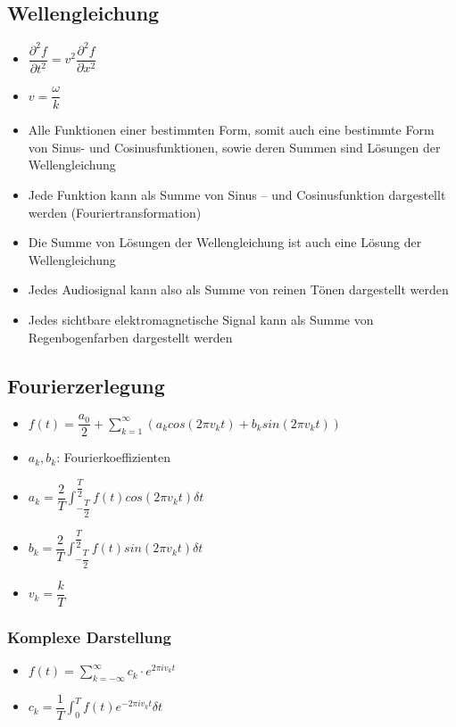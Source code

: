\documentclass[8pt,a4paper]{scrartcl}
\begin{document}
\begin{multicols*}{3}
						\subsection{Wellengleichung}
							\begin{itemize}\itemsep0pt
								\item $\dfrac{\partial^{2}f}{\partial t^{2}} = v^{2} \dfrac{\partial^{2}f}{\partial x^{2}} $
								\item $v=\dfrac{\omega}{k}$
								\item Alle Funktionen einer bestimmten Form, somit auch eine bestimmte Form von Sinus- und Cosinusfunktionen, sowie deren Summen sind Lösungen der Wellengleichung
								
								\item Jede Funktion kann als Summe von Sinus – und Cosinusfunktion dargestellt werden (Fouriertransformation)
								\item Die Summe von Lösungen der Wellengleichung ist auch eine Lösung der Wellengleichung
								\item Jedes Audiosignal kann also als Summe von reinen Tönen dargestellt werden
								\item Jedes sichtbare elektromagnetische Signal kann als Summe von Regenbogenfarben dargestellt werden
							\end{itemize}	
							
						\subsection{Fourierzerlegung}
							\begin{itemize}\itemsep0pt
								\item $f(t)=\dfrac{a_{0}}{2}+\sum_{k=1}^{\infty}(a_{k}cos(2\pi v_{k}t)+b_{k}sin(2\pi v_{k}t))$
								\item $a_{k}, b_{k}$: Fourierkoeffizienten
								\item $a_{k} = \dfrac{2}{T} \int_{-\dfrac{T}{2}}^{\dfrac{T}{2}}f(t)cos(2\pi v_{k}t)\delta t$
								\item $b_{k} = \dfrac{2}{T} \int_{-\dfrac{T}{2}}^{\dfrac{T}{2}}f(t)sin(2\pi v_{k}t)\delta t$
								\item $v_{k} = \dfrac{k}{T}$
							\end{itemize}	
							
							\subsubsection{Komplexe Darstellung}
								\begin{itemize}\itemsep0pt
									\item $f(t)= \sum_{k=-\infty}^{\infty} c_{k} \cdot e^{2\pi i v_{k}t}$
									\item $c_{k} = \dfrac{1}{T} \int_{0}^{T}f(t) e^{-2\pi i v_{k}t} \delta t$
								\end{itemize}
								

\end{multicols*}
\end{document}
